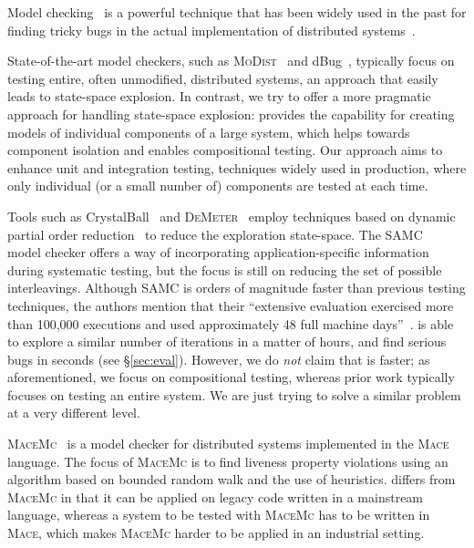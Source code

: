 Model checking~\cite{godefroid1997verisoft} is a powerful technique that has been widely used in the past for finding tricky bugs in the actual implementation of distributed systems~\cite{killian2007life, yang2009modist, yabandeh2009crystalball, guerraoui2011model, guo2011practical, simsa2011dbug, leesatapornwongsa2014samc}. 

State-of-the-art model checkers, such as \textsc{MoDist}~\cite{yang2009modist} and dBug~\cite{simsa2011dbug}, typically focus on testing entire, often unmodified, distributed systems, an approach that easily leads to state-space explosion. In contrast, we try to offer a more pragmatic approach for handling state-space explosion: \psharp provides the capability for creating models of individual components of a large system, which helps towards component isolation and enables compositional testing. Our approach aims to enhance unit and integration testing, techniques widely used in production, where only individual (or a small number of) components are tested at each time.

Tools such as CrystalBall~\cite{yabandeh2009crystalball} and \textsc{DeMeter}~\cite{guo2011practical} employ techniques based on dynamic partial order reduction~\cite{lauterburg2010evaluating} to reduce the exploration state-space. The SAMC~\cite{leesatapornwongsa2014samc} model checker offers a way of incorporating application-specific information during systematic testing, but the focus is still on reducing the set of possible interleavings. Although SAMC is orders of magnitude faster than previous testing techniques, the authors mention that their ``extensive evaluation exercised more than 100,000 executions and used approximately 48 full machine days''~\cite{leesatapornwongsa2014samc}. \psharp is able to explore a similar number of iterations in a matter of hours, and find serious bugs in seconds (see \S\ref{sec:eval}). However, we do \emph{not} claim that \psharp is faster; as aforementioned, we focus on compositional testing, whereas prior work typically focuses on testing an entire system. We are just trying to solve a similar problem at a very different level.

\textsc{MaceMc}~\cite{killian2007life} is a model checker for distributed systems implemented in the \textsc{Mace} language. The focus of \textsc{MaceMc} is to find liveness property violations using an algorithm based on bounded random walk and the use of heuristics. \psharp differs from \textsc{MaceMc} in that it can be applied on legacy code written in a mainstream language, whereas a system to be tested with \textsc{MaceMc} has to be written in \textsc{Mace}, which makes \textsc{MaceMc} harder to be applied in an industrial setting.

